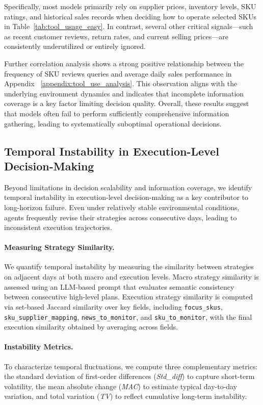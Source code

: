Specifically, most models primarily rely on supplier prices, inventory levels, SKU ratings, and historical sales records when deciding how to operate selected SKUs in Table~\ref{tab:tool_usage_easy}. In contrast, several other critical signals—such as recent customer reviews, return rates, and current selling prices—are consistently underutilized or entirely ignored.



Further correlation analysis shows a strong positive relationship between the frequency of SKU reviews queries and average daily sales performance in Appendix ~\ref{appendix:tool_use_analysis}. This observation aligns with the underlying environment dynamics and indicates that incomplete information coverage is a key factor limiting decision quality. Overall, these results suggest that models often fail to perform sufficiently comprehensive information gathering, leading to systematically suboptimal operational decisions.

\subsection{Temporal Instability in Execution-Level Decision-Making}

Beyond limitations in decision scalability and information coverage, we identify temporal instability in execution-level decision-making as a key contributor to long-horizon failure. Even under relatively stable environmental conditions, agents frequently revise their strategies across consecutive days, leading to inconsistent execution trajectories.

\paragraph{Measuring Strategy Similarity.}
We quantify temporal instability by measuring the similarity between strategies on adjacent days at both macro and execution levels. Macro strategy similarity is assessed using an LLM-based prompt that evaluates semantic consistency between consecutive high-level plans. Execution strategy similarity is computed via set-based Jaccard similarity over key fields, including \texttt{focus\_skus}, \texttt{sku\_supplier\_mapping}, \texttt{news\_to\_monitor}, and \texttt{sku\_to\_monitor}, with the final execution similarity obtained by averaging across fields.

\paragraph{Instability Metrics.}
To characterize temporal fluctuations, we compute three complementary metrics: the standard deviation of first-order differences (\textit{Std\_diff}) to capture short-term volatility, the mean absolute change (\textit{MAC}) to estimate typical day-to-day variation, and total variation (\textit{TV}) to reflect cumulative long-term instability.

